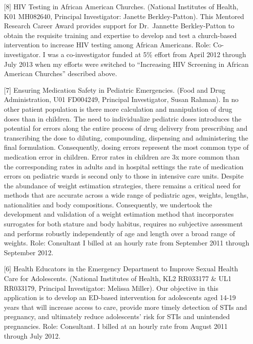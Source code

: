 \documentclass[
  12pt,
]{article}
\begin{document}
{[}8{]} HIV Testing in African American Churches. (National Institutes
of Health, K01 MH082640, Principal Investigator: Janette
Berkley-Patton). This Mentored Research Career Award provides support
for Dr.~Jannette Berkley-Patton to obtain the requisite training and
expertise to develop and test a church-based intervention to increase
HIV testing among African Americans. Role: Co-investigator. I was a
co-investigator funded at 5\% effort from April 2012 through July 2013
when my efforts were switched to ``Increasing HIV Screening in African
American Churches'' described above.

{[}7{]} Ensuring Medication Safety in Pediatric Emergencies. (Food and
Drug Administration, U01 FD004249, Principal Investigator, Susan
Rahman). In no other patient population is there more calculation and
manipulation of drug doses than in children. The need to individualize
pediatric doses introduces the potential for errors along the entire
process of drug delivery from prescribing and transcribing the dose to
diluting, compounding, dispensing and administering the final
formulation. Consequently, dosing errors represent the most common type
of medication error in children. Error rates in children are 3x more
common than the corresponding rates in adults and in hospital settings
the rate of medication errors on pediatric wards is second only to those
in intensive care units. Despite the abundance of weight estimation
strategies, there remains a critical need for methods that are accurate
across a wide range of pediatric ages, weights, lengths, nationalities
and body compositions. Consequently, we undertook the development and
validation of a weight estimation method that incorporates surrogates
for both stature and body habitus, requires no subjective assessment and
performs robustly independently of age and length over a broad range of
weights. Role: Consultant I billed at an hourly rate from September 2011
through September 2012.

{[}6{]} Health Educators in the Emergency Department to Improve Sexual
Health Care for Adolescents. (National Institutes of Health, KL2
RR033177 \& UL1 RR033179, Principal Investigator: Melissa Miller). Our
objective in this application is to develop an ED-based intervention for
adolescents aged 14-19 years that will increase access to care, provide
more timely detection of STIs and pregnancy, and ultimately reduce
adolescents' risk for STIs and unintended pregnancies. Role: Consultant.
I billed at an hourly rate from August 2011 through July 2012.
\end{document}
